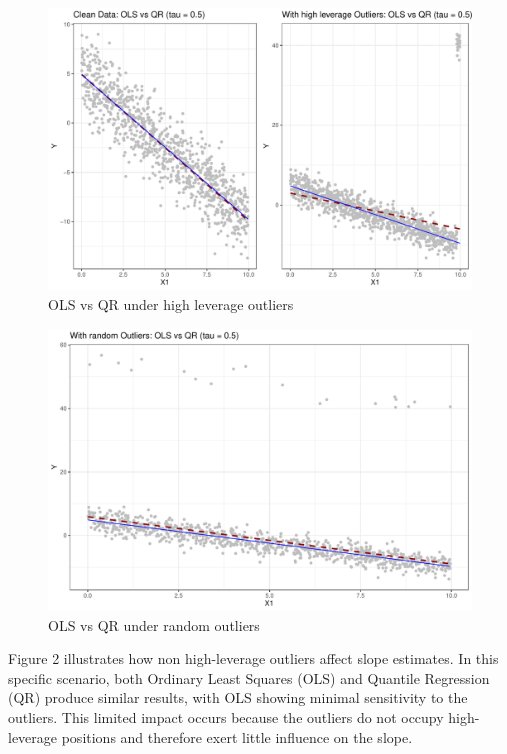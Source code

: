 \documentclass[fleqn,10pt]{latex/stylish_article} %
\begin{document}
\begin{figure}

{\centering \includegraphics[width=0.8\linewidth]{ADR_project_draft_files/figure-latex/unnamed-chunk-2-1} 

}

\caption{OLS vs QR under high leverage outliers}\label{fig:unnamed-chunk-2}
\end{figure}

\begin{figure}

{\centering \includegraphics[width=0.8\linewidth]{ADR_project_draft_files/figure-latex/unnamed-chunk-3-1} 

}

\caption{OLS vs QR under random outliers}\label{fig:unnamed-chunk-3}
\end{figure}

Figure 2 illustrates how non high-leverage outliers affect slope estimates. In this specific scenario, both Ordinary Least Squares (OLS) and Quantile Regression (QR) produce similar results, with OLS showing minimal sensitivity to the outliers. This limited impact occurs because the outliers do not occupy high-leverage positions and therefore exert little influence on the slope.
\end{document}
